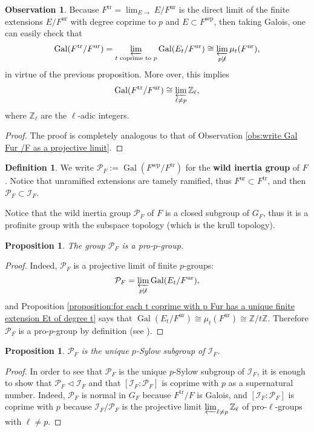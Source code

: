 \documentclass[12pt]{article}
\theoremstyle{plain}
\newtheorem{proposition}[theorem]{Proposition}
\theoremstyle{definition}
\newtheorem{definition}[theorem]{Definition}
\newtheorem{obs}[theorem]{Observation}
\newcommand{\integers}{\mathbb{Z}}
\newcommand{\Gal}[2]{\operatorname{Gal} ( #1 / #2 )}
\newcommand{\sep}[1]{{#1}^{\operatorname{sep}}}
\newcommand{\ur}[1]{{#1}^{\operatorname{ur}}}
\newcommand{\tr}[1]{{#1}^{\operatorname{tr}}}
\newcommand{\inercia}[1]{\mathcal I_{#1}}
\newcommand{\wild}[1]{\mathcal P_{#1}}
\begin{document}
\begin{obs}
Because $\tr F = \lim_{E \longrightarrow} E/\ur F$ is the direct limit of the finite extensions $E / \ur F$ with degree coprime to $p$ and $E \subset \sep F$, then taking Galois, one can easily check that
\[
 \Gal {\tr F } {\ur F} = \varprojlim_{t \text{ coprime to $p$}} \Gal {E_t} {\ur F} \cong \varprojlim_{p \not \mid t} \mu_t (\ur F),
\]
in virtue of the previous proposition. More over, this implies
\[
 \Gal {\tr F} {\ur F} \cong \varprojlim_{\ell \neq p} \integers_{\ell},
\]
where $\integers_\ell$ are the $\ell$-adic integers.
\end{obs}
\begin{proof}
The proof is completely analogous to that of Observation \ref{obs:write Gal Fur /F as a projective limit}.
\end{proof}

\begin{definition}
We write $\wild F := \Gal {\sep F} {\tr F}$ for the \textbf{wild inertia group} of $F$. Notice that unramified extensions are tamely ramified, thus $\ur F \subset \tr F$, and then $\wild F \subset \inercia F$.
\end{definition}

Notice that the wild inertia group $\wild F$ of $F$ is a closed subgroup of $G_F$, thus it is a profinite group with the subspace topology (which is the krull topology).

\begin{proposition}
The group $\wild F$ is a pro-$p$-group.
\end{proposition}
\begin{proof}
Indeed, $\wild F$ is a projective limit of finite $p$-groups:
\[
    \wild F = \varprojlim_{p \not \mid t} \Gal {E_t}{\ur F},
\]
and Proposition \ref{proposition:for each t coprime with p Fur has a unique finite extension Et of degree t} says that $\Gal {E_t} {\ur F} \cong \mu_t (\ur F) \cong \integers/t \integers$. Therefore $\wild F$ is a pro-$p$-group by definition (see \cite{ramakrishnan1998fourierAnalysisOnNumberFields}).
\end{proof}

\begin{proposition}
$\wild F$ is the unique $p$-Sylow subgroup of $\inercia F$.
\end{proposition}
\begin{proof}
In order to see that $\wild F$ is the unique $p$-Sylow subgroup of $\inercia F$, it is enough to show that $\wild F \triangleleft \inercia F$ and that $[\inercia F : \wild F]$ is coprime with $p$ as a supernatural number. Indeed, $\wild F$ is normal in $G_F$ because $\tr F / F$ is Galois, and $[\inercia F : \wild F]$ is coprime with $p$ because $\inercia F / \wild F$ is the projective limit $\varprojlim_{\ell \neq p} \integers_\ell$ of pro-$\ell$-groups with $\ell \neq p$.
\end{proof}
\end{document}
